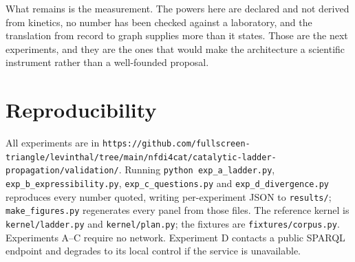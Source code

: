 \documentclass[11pt,twocolumn,a4paper]{article}
\theoremstyle{thmstyle}
\theoremstyle{definition}
\theoremstyle{remark}
\begin{document}
What remains is the measurement. The powers here are declared and not derived
from kinetics, no number has been checked against a laboratory, and the
translation from record to graph supplies more than it states. Those are the
next experiments, and they are the ones that would make the architecture a
scientific instrument rather than a well-founded proposal.

\section*{Reproducibility}

All experiments are in \texttt{https://github.com/fullscreen-triangle/levinthal/tree/main/nfdi4cat/catalytic-ladder-propagation/validation/}. Running
\texttt{python exp\_a\_ladder.py}, \texttt{exp\_b\_expressibility.py},
\texttt{exp\_c\_questions.py} and \texttt{exp\_d\_divergence.py} reproduces
every number quoted, writing per-experiment JSON to \texttt{results/};
\texttt{make\_figures.py} regenerates every panel from those files. The
reference kernel is \texttt{kernel/ladder.py} and \texttt{kernel/plan.py};
the fixtures are \texttt{fixtures/corpus.py}. Experiments A--C require no
network. Experiment D contacts a public SPARQL endpoint and degrades to its
local control if the service is unavailable.



\end{document}
